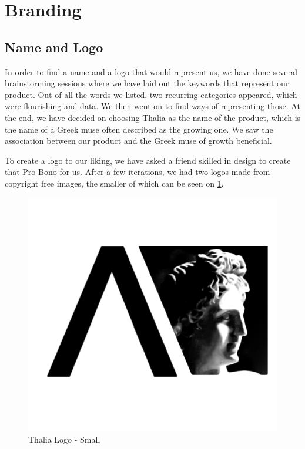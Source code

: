 \documentclass[main.tex]{subfiles}
\begin{document}
\section{Branding}

\subsection{Name and Logo}
In order to find a name and a logo that would represent us, we have done several brainstorming sessions where we have laid out the keywords that represent our product. Out of all the words we listed, two recurring categories appeared, which were flourishing and data. We then went on to find ways of representing those. At the end, we have decided on choosing Thalia as the name of the product, which is the name of a Greek muse often described as the growing one. We saw the association between our product and the Greek muse of growth beneficial.

To create a logo to our liking, we have asked a friend skilled in design to create that Pro Bono for us. After a few iterations, we had two logos made from copyright free images, the smaller of which can be seen on \figurename{\ref{small_logo}}.

\begin{figure}[H]
    \centering
    \includegraphics[scale=0.4]{03Branding/Pictures/small_logo.png}
    \caption{Thalia Logo - Small}
    \label{small_logo}
\end{figure}
\end{document}
